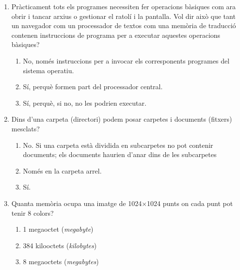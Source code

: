 \begin{enumerate}


\item Pràcticament tots els programes necessiten fer operacions
  bàsiques com ara obrir i tancar arxius o gestionar el ratolí i la
  pantalla. Vol dir això que tant un navegador com un processador de
  textos com una memòria de traducció contenen instruccions de
  programa per a executar aquestes operacions bàsiques?
  \begin{enumerate}
  \item No, només instruccions per a invocar els corresponents
    programes del sistema operatiu.
  \item Sí, perquè formen part del processador central.
  \item Sí, perquè, si no, no les podrien executar.
  \end{enumerate}

\item Dins d'una carpeta (directori) podem posar carpetes i documents
  (fitxers) mesclats?
  \begin{enumerate}
  \item No. Si una carpeta està dividida en subcarpetes no pot
    contenir documents; els documents haurien d'anar dins de les
    subcarpetes
  \item Només en la carpeta arrel.
  \item Sí. 
  \end{enumerate}

\item Quanta memòria ocupa una imatge de 1024$\times$1024 punts on
  cada punt pot tenir 8 colors?
  \begin{enumerate}
  \item 1 megaoctet (\emph{megabyte})
  \item 384 kilooctets (\emph{kilobytes})
  \item 8 megaoctets (\emph{megabytes})
  \end{enumerate}


\end{enumerate}
